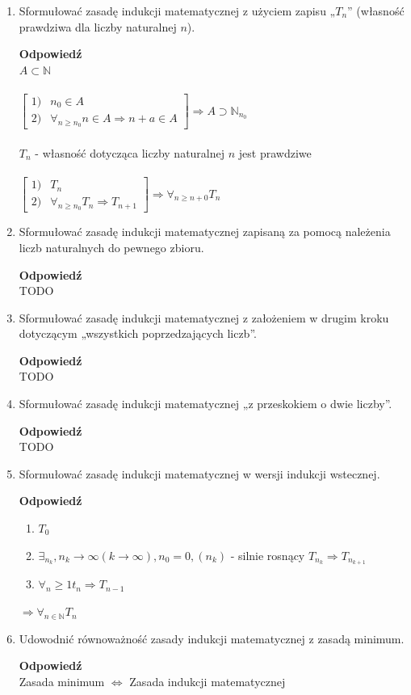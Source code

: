 \documentclass[12pt,a4paper]{article}
\theoremstyle{break}
\newcommand{\Odp}[1]{
		\begin{mdframed}[style=zadanie]
			\textbf{Odpowiedź}\\
			#1
		\end{mdframed}
	}
\begin{document}
\begin{enumerate}[1.]
	\item Sformułować zasadę indukcji matematycznej z użyciem zapisu „$T_n$” (własność prawdziwa dla liczby naturalnej $n$).
	\Odp{
		$A\subset \mathbb{N}$\\\\
		
		$\begin{bmatrix}
			1) & n_0\in A\\
			2) & \forall_{n\geq n_0} n\in A \Rightarrow n+a\in A
		\end{bmatrix} \Rightarrow A \supset \mathbb{N}_{n_0}$\\\\
		
		$T_n$ - własność dotycząca liczby naturalnej $n$ jest prawdziwe\\\\
		
		$\begin{bmatrix}
			1) & T_n\\
			2) & \forall_{n\geq n_0} T_n\Rightarrow T_{n+1}
		\end{bmatrix} \Rightarrow \forall_{n\geq n+0} T_n$
	}
	
	\item Sformułować zasadę indukcji matematycznej zapisaną za pomocą należenia liczb naturalnych do pewnego zbioru.
	\Odp{
		TODO
	}
	
	\item Sformułować zasadę indukcji matematycznej z założeniem w drugim kroku dotyczącym „wszystkich poprzedzających liczb”.
	\Odp{
		TODO
	}
	
	\item Sformułować zasadę indukcji matematycznej „z przeskokiem o dwie liczby”.
	\Odp{
		TODO
	}
	
	\item Sformułować zasadę indukcji matematycznej w wersji indukcji wstecznej.
	\Odp{
		\begin{enumerate}[1)]
			\item $T_0$
			\item $\exists_{n_k}, n_k \rightarrow \infty (k\rightarrow \infty), n_0 = 0, (n_k)$ - silnie rosnący $T_{n_k} \Rightarrow T_{n_{k+1}}$
			\item $ \forall_n\geq 1 t_n \Rightarrow T_{n-1}$
		\end{enumerate}
	
		$\Rightarrow \forall_{n\in\mathbb{N}} T_n$
	}
	
	\item Udowodnić równoważność zasady indukcji matematycznej z zasadą minimum.
	\Odp{
		Zasada minimum $\Leftrightarrow$ Zasada indukcji matematycznej
		
}
\end{enumerate}
\end{document}
